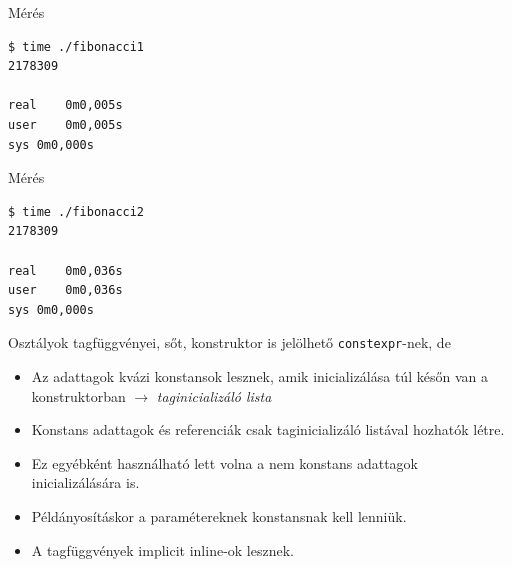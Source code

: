 \documentclass[usenames,dvipsnames,aspectratio=169]{beamer}
\begin{document}
\begin{frame}[fragile]
    \begin{exampleblock}{}
        \scriptsize
        \vspace{-.2cm}
        
        \vspace{-.2cm}
    \end{exampleblock}
    \begin{block}{Mérés}
        \vspace{-.4cm}
        \scriptsize
        \begin{verbatim}
$ time ./fibonacci1
2178309

real	0m0,005s
user	0m0,005s
sys	0m0,000s    
\end{verbatim}
        \vspace{-.4cm}
    \end{block}
\end{frame}

\begin{frame}[fragile]
    \begin{exampleblock}{}
        \scriptsize
        \vspace{-.2cm}
        
        \vspace{-.2cm}
    \end{exampleblock}
    \begin{block}{Mérés}
        \vspace{-.4cm}
        \scriptsize
        \begin{verbatim}
$ time ./fibonacci2
2178309

real	0m0,036s
user	0m0,036s
sys	0m0,000s            
\end{verbatim}
        \vspace{-.4cm}
    \end{block}
\end{frame}

\begin{frame}
    Osztályok tagfüggvényei, sőt, konstruktor is jelölhető \texttt{constexpr}-nek, de
    \begin{itemize}
        \item Az adattagok kvázi konstansok lesznek, amik inicializálása túl későn van a konstruktorban $\to$ \emph{taginicializáló lista}
        \item Konstans adattagok és referenciák csak taginicializáló listával hozhatók létre.
        \item Ez egyébként használható lett volna a nem konstans adattagok inicializálására is.
        \item Példányosításkor a paramétereknek konstansnak kell lenniük.
        \item A tagfüggvények implicit inline-ok lesznek.
    \end{itemize}
\end{frame}
\end{document}
